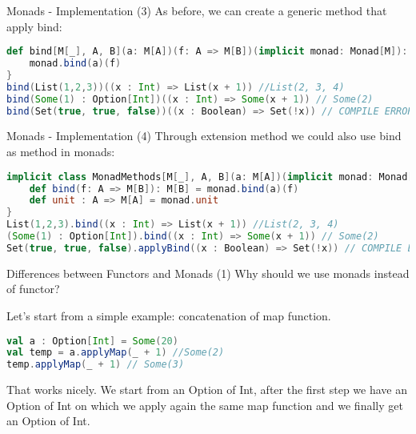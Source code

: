 \begin{frame}[fragile]{Monads - Implementation (3)}		
	As before, we can create a generic method that apply bind:
\begin{lstlisting}[language=scala]
def bind[M[_], A, B](a: M[A])(f: A => M[B])(implicit monad: Monad[M]): M[B] = {
	monad.bind(a)(f)
}
bind(List(1,2,3))((x : Int) => List(x + 1)) //List(2, 3, 4)
bind(Some(1) : Option[Int])((x : Int) => Some(x + 1)) // Some(2)
bind(Set(true, true, false))((x : Boolean) => Set(!x)) // COMPILE ERROR
\end{lstlisting}	
\end{frame}

\begin{frame}[fragile]{Monads - Implementation (4)}	
	Through extension method we could also use bind as method in monads:
\begin{lstlisting}[language=scala]
implicit class MonadMethods[M[_], A, B](a: M[A])(implicit monad: Monad[M]) {
	def bind(f: A => M[B]): M[B] = monad.bind(a)(f)
	def unit : A => M[A] = monad.unit
}
List(1,2,3).bind((x : Int) => List(x + 1)) //List(2, 3, 4)
(Some(1) : Option[Int]).bind((x : Int) => Some(x + 1)) // Some(2)
Set(true, true, false).applyBind((x : Boolean) => Set(!x)) // COMPILE ERROR	
\end{lstlisting}	
\end{frame}

\begin{frame}[fragile]{Differences between Functors and Monads (1)}
	Why should we use monads instead of functor?
	
	Let's start from a simple example: concatenation of map function.
\begin{lstlisting}[language=scala]
val a : Option[Int] = Some(20)
val temp = a.applyMap(_ + 1) //Some(2)
temp.applyMap(_ + 1) // Some(3)
\end{lstlisting}				
	That works nicely. We start from an Option of Int, after the first step we have an Option of Int on which we apply again 
	the same map function and we finally get an Option of Int.
\end{frame}

